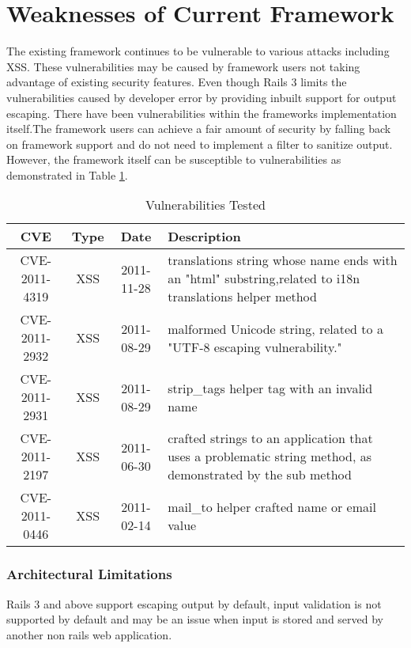 \documentclass[10pt, conference, compsocconf]{IEEEtran}
\begin{document}
\section{Weaknesses of Current Framework} %
\label{sec:weaknesses_of_current_framework}
The existing framework continues to be vulnerable to various attacks including XSS. These vulnerabilities may be caused by framework users not taking advantage of existing security features. Even though Rails 3 limits the vulnerabilities caused by developer error by providing inbuilt support for output escaping. There have been vulnerabilities within the frameworks implementation itself.The framework users can achieve a fair amount of security by falling back on framework support and do not need to implement a filter to sanitize output. However, the framework itself  can be susceptible to vulnerabilities as demonstrated in Table \ref{tab:vulnerabilities}.

\begin{table}
\caption{Vulnerabilities Tested}
\label{tab:vulnerabilities}
\centering
\begin{tabular}{|c|c|c|p{2.5cm}|}
\hline

\bf{CVE}
& \bf{Type}
& \textbf{Date}
& \textbf{Description} \\

\hline
CVE-2011-4319
&XSS
&2011-11-28
& translations string whose name ends with an "html" substring,related to i18n translations helper method\\
\hline

CVE-2011-2932
& XSS
& 2011-08-29
& malformed Unicode string, related to a "UTF-8 escaping vulnerability." \\
\hline
CVE-2011-2931
& XSS
& 2011-08-29
& strip\_tags helper tag with an invalid name \\
\hline
CVE-2011-2197
& XSS
& 2011-06-30
& crafted strings to an application that uses a problematic string method, as demonstrated by the sub method \\
\hline
CVE-2011-0446
& XSS
& 2011-02-14
& mail\_to helper crafted name or email value \\
\hline
\end{tabular}
\end{table}



\subsubsection{Architectural Limitations} %
\label{ssub:architectural_limitations}
Rails 3 and above support escaping output by default, input validation is not supported by default and may be an issue when input is stored and served by another non rails web application.
\end{document}
